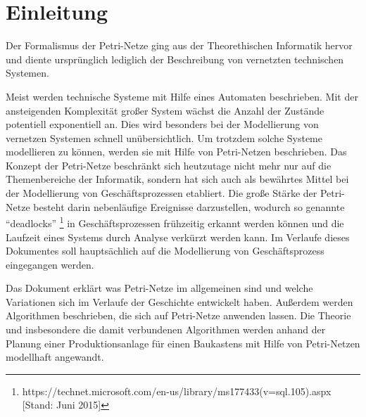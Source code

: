 \section{Einleitung}
Der Formalismus der Petri-Netze ging aus der Theorethischen Informatik hervor
und diente ursprünglich lediglich der Beschreibung von vernetzten technischen Systemen.

Meist werden technische Systeme mit Hilfe eines Automaten beschrieben.
Mit der ansteigenden Komplexität großer System wächst die Anzahl der Zustände potentiell exponentiell an.
Dies wird besonders bei der Modellierung von vernetzen Systemen schnell unübersichtlich.
Um trotzdem solche Systeme modellieren zu können, werden sie mit Hilfe von Petri-Netzen beschrieben.
Das Konzept der Petri-Netze beschränkt sich heutzutage nicht mehr nur auf die Themenbereiche der Informatik,
sondern hat sich auch als bewährtes Mittel bei der Modellierung von Geschäftsprozessen etabliert.
Die große Stärke der Petri-Netze besteht darin nebenläufige Ereignisse darzustellen,
wodurch so genannte \enquote{deadlocks} \footnote{https://technet.microsoft.com/en-us/library/ms177433(v=sql.105).aspx [Stand: Juni 2015]}
in Geschäftsprozessen frühzeitig erkannt werden können und 
die Laufzeit eines Systems durch Analyse verkürzt werden kann.
Im Verlaufe dieses Dokumentes soll hauptsächlich auf die Modellierung von Geschäftsprozess eingegangen werden. 

Das Dokument erklärt was Petri-Netze im allgemeinen sind und
welche Variationen sich im Verlaufe der Geschichte entwickelt haben.
Außerdem werden Algorithmen beschrieben, die sich auf Petri-Netze anwenden lassen.
Die Theorie und insbesondere die damit verbundenen Algorithmen
werden anhand der Planung einer Produktionsanlage für einen Baukastens
mit Hilfe von Petri-Netzen modellhaft angewandt.



